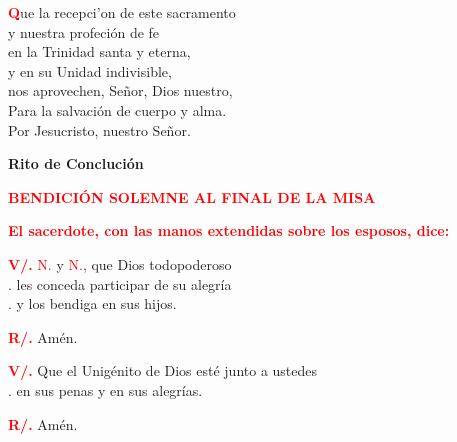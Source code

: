 \documentclass[12pt, letterpaper, spanish]{report}
\begin{document}
\Large \lettrine{\bfseries \textcolor{red}{Q}}{}ue la recepci'on de este sacramento\\
y nuestra profeci\'on de fe\\
en la Trinidad santa y eterna,\\
y en su Unidad indivisible,\\
nos aprovechen, Se\~nor, Dios nuestro,\\
Para la salvaci\'on de cuerpo y alma.\\
Por Jesucristo, nuestro Se\~nor.\newline

\newpage

\begin{center}
\Huge {\bfseries Rito de Concluci\'on}
\end{center}

\Large {\bfseries \textcolor{red}{BENDICI\'ON SOLEMNE AL FINAL DE LA MISA}} \newline

\large{\bfseries \textcolor{red}{El sacerdote, con las manos extendidas sobre los esposos, dice:}}\newline

\Large \hspace{-0.9cm} {\bfseries \textcolor{red}{V/.}} \hspace{0.5cm} \textcolor{red}{N.} y \textcolor{red}{N.}, que Dios todopoderoso\\
.\hspace{1.5cm} les conceda participar de su alegr\'ia\\
.\hspace{1.5cm} y los bendiga en sus hijos.\newline

\Large \hspace{-0.9cm} {\bfseries \textcolor{red}{R/.}} \hspace{0.5cm} Am\'en.\newline

\Large \hspace{-0.9cm} {\bfseries \textcolor{red}{V/.}} \hspace{0.5cm} Que el Unig\'enito de Dios est\'e junto a ustedes\\
.\hspace{1.5cm} en sus penas y en sus alegr\'ias.\newline

\Large \hspace{-0.9cm} {\bfseries \textcolor{red}{R/.}} \hspace{0.5cm} Am\'en.\newline
\end{document}
